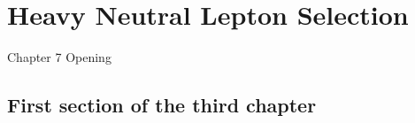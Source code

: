 \chapter{Heavy Neutral Lepton Selection}
\label{ChapterSelection}

\ifpdf
    \graphicspath{{Chapter7/Figs/Raster/}{Chapter7/Figs/PDF/}{Chapter7/Figs/}}
\else
    \graphicspath{{Chapter7/Figs/Vector/}{Chapter7/Figs/}}
\fi


Chapter 7 Opening


\section{First section of the third chapter}
